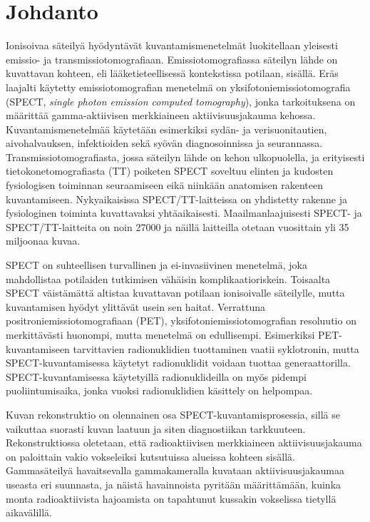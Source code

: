 \section{Johdanto}
Ionisoivaa säteilyä hyödyntävät kuvantamismenetelmät luokitellaan yleisesti emissio- ja transmissiotomografiaan. Emissiotomografiassa säteilyn lähde on kuvattavan kohteen, eli lääketieteellisessä kontekstissa potilaan, sisällä. Eräs laajalti käytetty emissiotomografian menetelmä on yksifotoniemissiotomografia (SPECT, \textit{single photon emission computed tomography}), jonka tarkoituksena on määrittää gamma-aktiivisen merkkiaineen aktiivisuusjakauma kehossa\cite{bruyant_analytic_2002}. Kuvantamismenetelmää käytetään esimerkiksi sydän- ja verisuonitautien, aivohalvauksen, infektioiden sekä syövän diagnosoinnissa ja seurannassa.\cite{cherry_single_2012, van_audenhaege_review_2015, crisan_radiopharmaceuticals_2022, ljungberg_spectct_2018} Transmissiotomografiasta, jossa säteilyn lähde on kehon ulkopuolella\cite{bercovich_medical_2018}, ja erityisesti tietokonetomografiasta (TT) poiketen SPECT soveltuu elinten ja kudosten fysiologisen toiminnan seuraamiseen eikä niinkään anatomisen rakenteen kuvantamiseen\cite{bercovich_medical_2018, crisan_radiopharmaceuticals_2022, cherry_single_2012}. Nykyaikaisissa SPECT/TT-laitteissa on yhdistetty rakenne ja fysiologinen toiminta kuvattavaksi yhtäaikaisesti\cite{hutton_origins_2014, cherry_single_2012, bercovich_medical_2018, ljungberg_spectct_2018}. Maailmanlaajuisesti SPECT- ja SPECT/TT-laitteita on noin 27000\cite{cutler_global_2021} ja näillä laitteilla otetaan vuosittain yli 35 miljoonaa kuvaa\cite{oecd_supply_2019}.

SPECT on suhteellisen turvallinen ja ei-invasiivinen menetelmä, joka mahdollistaa potilaiden tutkimisen vähäisin komplikaatioriskein. Toisaalta SPECT väistämättä altistaa kuvattavan potilaan ionisoivalle säteilylle, mutta kuvantamisen hyödyt ylittävät usein sen haitat.\cite{ljungberg_spectct_2018} Verrattuna positroniemissiotomografiaan (PET), yksifotoniemissiotomografian resoluutio on merkittävästi huonompi, mutta menetelmä on edullisempi\cite{crisan_radiopharmaceuticals_2022, cherry_single_2012}. Esimerkiksi PET-kuvantamiseen tarvittavien radionuklidien tuottaminen vaatii syklotronin, mutta SPECT-kuvantamisessa käytetyt radionuklidit voidaan tuottaa generaattorilla. SPECT-kuvantamisessa käytetyillä radionuklideilla on myös pidempi puoliintumisaika, jonka vuoksi radionuklidien käsittely on helpompaa.\cite{crisan_radiopharmaceuticals_2022}

Kuvan rekonstruktio on olennainen osa SPECT-kuvantamisprosessia, sillä se vaikuttaa suorasti kuvan laatuun ja siten diagnostiikan tarkkuuteen\cite{slomka_novel_2022}. Rekonstruktiossa oletetaan, että radioaktiivisen merkkiaineen aktiivisuusjakauma on paloittain vakio vokseleiksi kutsutuissa alueissa kohteen sisällä. Gammasäteilyä havaitsevalla gammakameralla kuvataan aktiivisuusjakaumaa useasta eri suunnasta, ja näistä havainnoista pyritään määrittämään, kuinka monta radioaktiivista hajoamista on tapahtunut kussakin vokselissa tietyllä aikavälillä.\cite{bruyant_analytic_2002, slomka_novel_2022}

